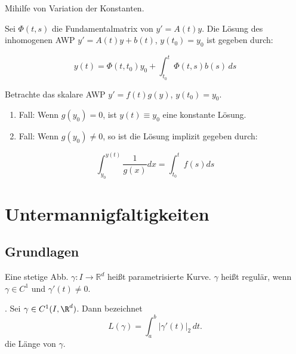 \documentclass[11pt, a4paper]{article}
\begin{document}
\begin{lemma} Mihilfe von Variation der Konstanten. \bigskip

Sei $\Phi(t,s)$ die Fundamentalmatrix von $y'=A(t)y$.
Die Lösung des inhomogenen AWP
$y'=A(t)y+b(t)$, $y(t_0)=y_0$
ist gegeben durch:

\[
y(t)=\Phi(t,t_0)y_0
+
\int_{t_0}^{t} \Phi(t,s)b(s)\,ds
\]

\end{lemma}

\begin{lemma}

Betrachte das skalare AWP $y'=f(t)g(y)$, $y(t_0)=y_0$.

\begin{enumerate}
\item Fall: Wenn $g(y_0)=0$, ist $y(t)\equiv y_0$ eine konstante Lösung.
\item Fall: Wenn $g(y_0)\neq 0$, so ist die Lösung implizit gegeben durch:
\end{enumerate}

\[
\int_{y_0}^{y(t)} \frac{1}{g(x)}dx
=
\int_{t_0}^{t} f(s)ds
\]
\end{lemma}


\newpage
\section{Untermannigfaltigkeiten}

\vspace{0.3cm} \par \subsection{Grundlagen}


\begin{definition} Eine stetige Abb. $\gamma : I \to \mathbb{R}^d$ heißt parametrisierte Kurve. $\gamma$ heißt regulär, wenn
$\gamma \in C^1$ und $\gamma'(t) \neq 0$.
\end{definition}


\begin{definition}. Sei $\gamma\in C^1(I,\R^d)$. Dann bezeichnet
\[
L(\gamma) = \int_a^b |\gamma'(t)|_2 \, dt.
\]
die Länge von $\gamma$.
\end{definition}
\end{document}
